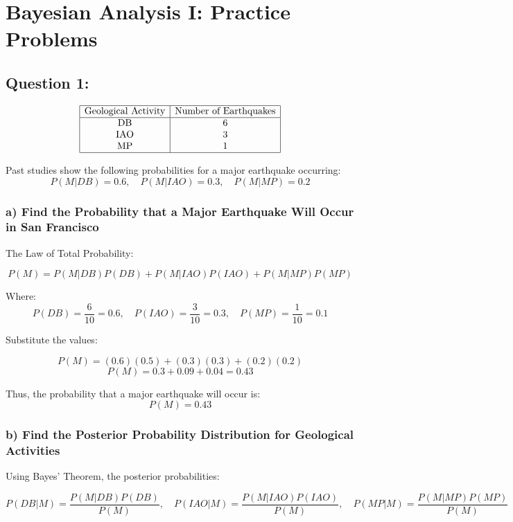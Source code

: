 \documentclass{article}
\begin{document}
\section*{Bayesian Analysis I: Practice Problems}


\subsection*{Question 1:}

\[
\begin{array}{|c|c|}
\hline
\text{Geological Activity} & \text{Number of Earthquakes} \\
\hline
\text{DB} & 6 \\
\text{IAO} & 3 \\
\text{MP} & 1 \\
\hline
\end{array}
\]

Past studies show the following probabilities for a major earthquake occurring:
\[
P(M | DB) = 0.6, \quad P(M | IAO) = 0.3, \quad P(M | MP) = 0.2
\]

\subsubsection*{a) Find the Probability that a Major Earthquake Will Occur in San Francisco}

The Law of Total Probability:

\[
P(M) = P(M | DB)P(DB) + P(M | IAO)P(IAO) + P(M | MP)P(MP)
\]

Where:
\[
P(DB) = \frac{6}{10} = 0.6, \quad P(IAO) = \frac{3}{10} = 0.3, \quad P(MP) = \frac{1}{10} = 0.1
\]

Substitute the values:

\[
P(M) = (0.6)(0.5) + (0.3)(0.3) + (0.2)(0.2)
\]
\[
P(M) = 0.3 + 0.09 + 0.04 = 0.43
\]

Thus, the probability that a major earthquake will occur is:
\[
\boxed{P(M) = 0.43}
\]

\subsubsection*{b) Find the Posterior Probability Distribution for Geological Activities}

Using Bayes' Theorem, the posterior probabilities:

\[
P(DB | M) = \frac{P(M | DB)P(DB)}{P(M)}, \quad P(IAO | M) = \frac{P(M | IAO)P(IAO)}{P(M)}, \quad P(MP | M) = \frac{P(M | MP)P(MP)}{P(M)}
\]
\end{document}
